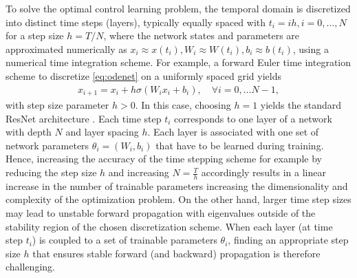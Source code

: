 \documentclass[12pt]{amsart}
\begin{document}
To solve the optimal control learning problem, the temporal domain is discretized into distinct time steps (layers), typically equally spaced with $t_i=ih, i=0,\dots, N$ for a step size $h = T/N$, where the network states and parameters are approximated numerically as $x_i \approx x(t_i), W_i \approx W(t_i), b_i \approx b(t_i)$, using a numerical time integration scheme.
For example, a forward Euler time integration scheme to discretize \eqref{eq:odenet} on a uniformly spaced grid
yields
\begin{align}
\label{eq:discrete_odenet_BE}
  x_{i+1} = x_i + h \sigma(W_ix_i + b_i), \quad \forall i=0,\dots N-1,
\end{align}
with step size parameter $h>0$.
In this case, choosing $h=1$ yields the standard ResNet architecture \cite{he2016deep}.
Each time step $t_i$ corresponds to one layer of a network with depth $N$ and layer spacing $h$.
Each layer is associated with one set of network parameters $\theta_i = (W_i, b_i)$ that have to be learned during training.
Hence, increasing the accuracy of the time stepping scheme for example  by reducing the step size $h$ and increasing $N=\frac{T}{h}$ accordingly results in a linear increase in the number of trainable parameters increasing the dimensionality and complexity of the optimization problem.
On the other hand, larger time step sizes may lead to unstable forward propagation with eigenvalues outside of the stability region of the chosen discretization scheme.
When each layer (at time step $t_i$) is coupled to a set of trainable parameters $\theta_i$, finding an appropriate step size $h$ that ensures stable forward (and backward) propagation is therefore challenging.
\end{document}
